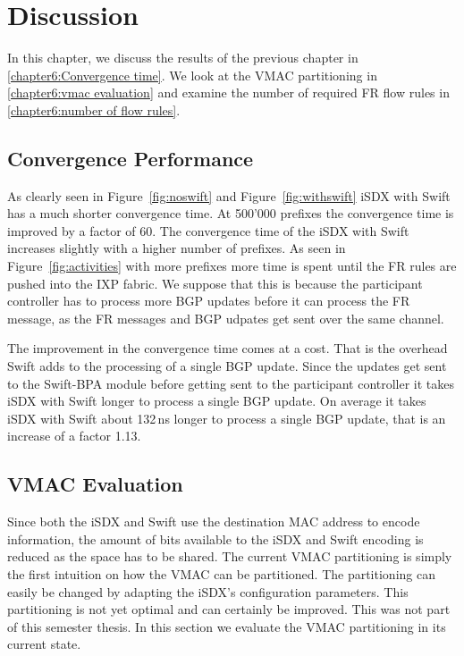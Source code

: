 \chapter{\label{chapter6}Discussion}

In this chapter, we discuss the results of the previous chapter in \ref{chapter6:Convergence time}. We look at the VMAC partitioning in \ref{chapter6:vmac evaluation} and examine the number of required FR flow rules in \ref{chapter6:number of flow rules}.

\section{\label{chapter6:Convergence time}Convergence Performance}

As clearly seen in Figure~\ref{fig:noswift} and Figure~\ref{fig:withswift} iSDX with Swift has a much shorter convergence time. At 500'000 prefixes the convergence time is improved by a factor of 60. The convergence time of the iSDX with Swift increases slightly with a higher number of prefixes. As seen in Figure~\ref{fig:activities} with more prefixes more time is spent until the FR rules are pushed into the IXP fabric. We suppose that this is because the participant controller has to process more BGP updates before it can process the FR message, as the FR messages and BGP udpates get sent over the same channel.

The improvement in the convergence time comes at a cost. That is the overhead Swift adds to the processing of a single BGP update. Since the updates get sent to the Swift-BPA module before getting sent to the participant controller it takes iSDX with Swift longer to process a single BGP update. On average it takes iSDX with Swift about 132\,ns longer to process a single BGP update, that is an increase of a factor 1.13. 

\section{\label{chapter6:vmac evaluation}VMAC Evaluation}

Since both the iSDX and Swift use the destination MAC address to encode information, the amount of bits available to the iSDX and Swift encoding is reduced as the space has to be shared. The current VMAC partitioning is simply the first intuition on how the VMAC can be partitioned. The partitioning can easily be changed by adapting the iSDX's configuration parameters. This partitioning is not yet optimal and can certainly be improved. This was not part of this semester thesis. In this section we evaluate the VMAC partitioning in its current state.

